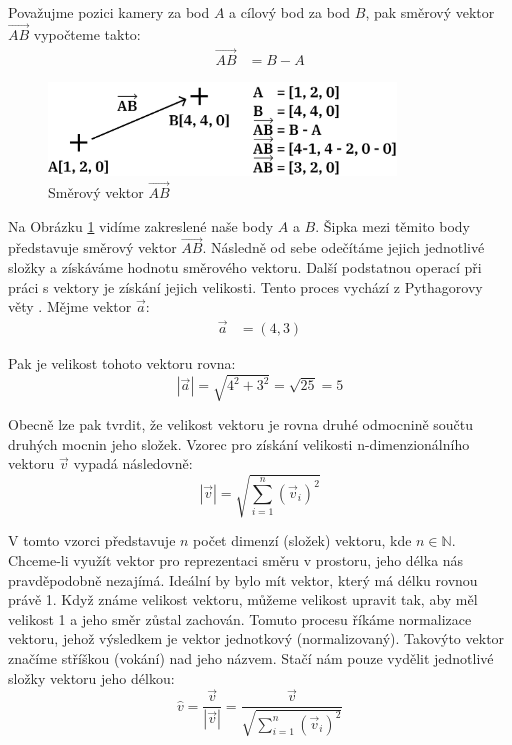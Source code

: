 \documentclass[12pt]{article}
\begin{document}
Považujme pozici kamery za bod $A$ a cílový bod za bod $B$, pak směrový vektor $\vec{AB}$ vypočteme takto:
\begin{align}
    \vec{AB} &= B - A
\end{align}

\vspace{0.5cm}
\begin{figure}[h]
    \centering
    \includegraphics[height=2.5cm]{vector_sub.png}
    \caption{Směrový vektor $\vec{AB}$}
    \label{fig:Směrový vektor AB}
\end{figure}

Na Obrázku \ref{fig:Směrový vektor AB} vidíme zakreslené naše body $A$ a $B$. Šipka mezi těmito body představuje směrový vektor $\vec{AB}$. Následně od sebe odečítáme jejich jednotlivé složky a získáváme hodnotu směrového vektoru. Další podstatnou operací při práci s vektory je získání jejich velikosti. Tento proces vychází z Pythagorovy věty \cite{pythagorean_theorem}. Mějme vektor $\vec{a}$:
\begin{align}
    \vec{a} &= (4, 3)
\end{align}

Pak je velikost tohoto vektoru rovna:
\begin{equation}
    |\vec{a}| = \sqrt{4^2 + 3^2} = \sqrt{25} = 5
\end{equation}

Obecně lze pak tvrdit, že velikost vektoru je rovna druhé odmocnině součtu druhých mocnin jeho složek. Vzorec pro získání velikosti n-dimenzionálního vektoru $\vec{v}$ vypadá následovně:
\begin{equation}
    |\vec{v}| = \sqrt{\sum_{i = 1}^{n} (\vec{v}_i)^2}
\end{equation}

V tomto vzorci představuje $n$ počet dimenzí (složek) vektoru, kde $n \in \mathbb{N}$. Chceme-li využít vektor pro reprezentaci směru v prostoru, jeho délka nás pravděpodobně nezajímá. Ideální by bylo mít vektor, který má délku rovnou právě 1. Když známe velikost vektoru, můžeme velikost upravit tak, aby měl velikost 1 a jeho směr zůstal zachován. Tomuto procesu říkáme normalizace vektoru, jehož výsledkem je vektor jednotkový (normalizovaný). Takovýto vektor značíme stříškou (vokání) nad jeho názvem. Stačí nám pouze vydělit jednotlivé složky vektoru jeho délkou:
\begin{equation}
    \hat{v} = \frac{\vec{v}}{|\vec{v}|} = \frac{\vec{v}}{\sqrt{\sum_{i = 1}^{n} (\vec{v}_i)^2}}
\end{equation}
\end{document}
